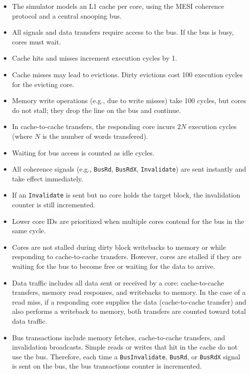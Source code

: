 \documentclass[a4paper,12pt]{article}
\begin{document}
\begin{itemize}
    \item The simulator models an L1 cache per core, using the MESI coherence protocol and a central snooping bus.
    \item All signals and data transfers require access to the bus. If the bus is busy, cores must wait.
    \item Cache hits and misses increment execution cycles by 1.
    \item Cache misses may lead to evictions. Dirty evictions cost 100 execution cycles for the evicting core.
    \item Memory write operations (e.g., due to write misses) take 100 cycles, but cores do not stall; they drop the line on the bus and continue.
    \item In cache-to-cache transfers, the responding core incurs $2N$ execution cycles (where $N$ is the number of words transfered).
    \item Waiting for bus access is counted as idle cycles.
    \item All coherence signals (e.g., \texttt{BusRd}, \texttt{BusRdX}, \texttt{Invalidate}) are sent instantly and take effect immediately.
    \item If an \texttt{Invalidate} is sent but no core holds the target block, the invalidation counter is still incremented.
    \item Lower core IDs are prioritized when multiple cores contend for the bus in the same cycle.
    \item Cores are not stalled during dirty block writebacks to memory or while responding to cache-to-cache transfers. However, cores are stalled if they are waiting for the bus to become free or waiting for the data to arrive.
    \item Data traffic includes all data sent or received by a core: cache-to-cache transfers, memory read responses, and writebacks to memory. In the case of a read miss, if a responding core supplies the data (cache-to-cache transfer) and also performs a writeback to memory, both transfers are counted toward total data traffic.
    \item Bus transactions include memory fetches, cache-to-cache transfers, and invalidation broadcasts. Simple reads or writes that hit in the cache do not use the bus. Therefore, each time a \texttt{BusInvalidate}, \texttt{BusRd}, or \texttt{BusRdX} signal is sent on the bus, the bus transactions counter is incremented.


\end{itemize}
\end{document}
